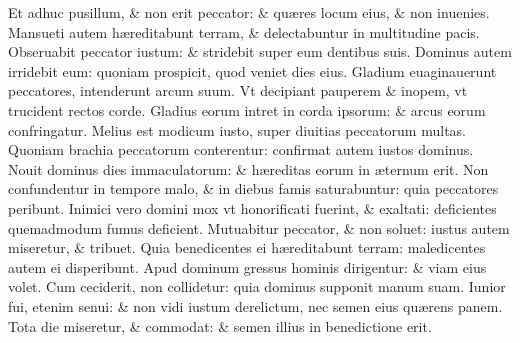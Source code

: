 \documentclass[a5paper,10pt]{book}
\def\ae{æ}
\begin{document}
\begin{multicols*}{2}
\newline \color{red} E\color{black}t adhuc pusillum, \& non erit peccator: \& qu\ae res locum eius, \& non inuenies.
\newline \color{red} M\color{black}ansueti autem h\ae reditabunt terram, \& delectabuntur in multitudine pacis.
\newline \color{red} O\color{black}bseruabit peccator iustum: \& stridebit super eum dentibus suis.
\newline \color{red} D\color{black}ominus autem irridebit eum: quoniam prospicit, quod veniet dies eius.
\newline \color{red} G\color{black}ladium euaginauerunt peccatores, intenderunt arcum suum.
\newline \color{red} V\color{black}t decipiant pauperem \& inopem, vt trucident rectos corde.%
\newline \color{red} G\color{black}ladius eorum intret in corda ipsorum: \& arcus eorum confringatur.
\newline \color{red} M\color{black}elius est modicum iusto, super diuitias peccatorum multas.
\newline \color{red} Q\color{black}uoniam brachia peccatorum conterentur: confirmat autem iustos dominus.
\newline \color{red} N\color{black}ouit dominus dies immaculatorum: \& h\ae reditas eorum in \ae ternum erit.
\newline \color{red} N\color{black}on confundentur in tempore malo, \& in diebus famis saturabuntur: quia peccatores peribunt.
\newline \color{red} I\color{black}nimici vero domini mox vt honorificati fuerint, \& exaltati: deficientes quemadmodum fumus deficient.
\newline \color{red} M\color{black}utuabitur peccator, \& non soluet: iustus autem miseretur, \& tribuet.
\newline \color{red} Q\color{black}uia benedicentes ei h\ae reditabunt terram: maledicentes autem ei disperibunt.
\newline \color{red} A\color{black}pud dominum gressus hominis dirigentur: \& viam eius volet.
\newline \color{red} C\color{black}um ceciderit, non collidetur: quia dominus supponit manum suam.
\newline \color{red} I\color{black}unior fui, etenim senui: \& non vidi iustum derelictum, nec semen eius qu\ae rens panem.
\newline \color{red} T\color{black}ota die miseretur, \& commodat: \& semen illius in benedictione erit.

\end{multicols*}
\end{document}

